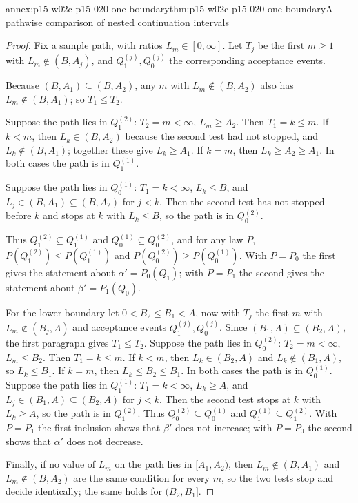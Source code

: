 \begin{annexitem}{annex:p15-w02c-p15-020-one-boundary}{thm:p15-w02c-p15-020-one-boundary}{A pathwise comparison of nested continuation intervals}
\begin{proof}
Fix a sample path, with ratios \(L_m\in[0,\infty]\). Let \(T_j\) be the
first \(m\geq1\) with \(L_m\notin(B,A_j)\), and \(Q_1^{(j)},Q_0^{(j)}\)
the corresponding acceptance events.

Because \((B,A_1)\subseteq(B,A_2)\), any \(m\) with
\(L_m\notin(B,A_2)\) also has \(L_m\notin(B,A_1)\); so \(T_1\leq T_2\).

Suppose the path lies in \(Q_1^{(2)}\): \(T_2=m<\infty\),
\(L_m\geq A_2\). Then \(T_1=k\leq m\). If \(k<m\), then
\(L_k\in(B,A_2)\) because the second test had not stopped, and
\(L_k\notin(B,A_1)\); together these give \(L_k\geq A_1\). If \(k=m\),
then \(L_k\geq A_2\geq A_1\). In both cases the path is in
\(Q_1^{(1)}\).

Suppose the path lies in \(Q_0^{(1)}\): \(T_1=k<\infty\), \(L_k\leq B\),
and \(L_j\in(B,A_1)\subseteq(B,A_2)\) for \(j<k\). Then the second test
has not stopped before \(k\) and stops at \(k\) with \(L_k\leq B\), so
the path is in \(Q_0^{(2)}\).

Thus \(Q_1^{(2)}\subseteq Q_1^{(1)}\) and
\(Q_0^{(1)}\subseteq Q_0^{(2)}\), and for any law \(P\),
\(P(Q_1^{(2)})\leq P(Q_1^{(1)})\) and
\(P(Q_0^{(2)})\geq P(Q_0^{(1)})\). With \(P=P_0\) the first gives the
statement about \(\alpha'=P_0(Q_1)\); with \(P=P_1\) the second gives
the statement about \(\beta'=P_1(Q_0)\).

For the lower boundary let \(0<B_2\leq B_1<A\), now with \(T_j\) the
first \(m\) with \(L_m\notin(B_j,A)\) and acceptance events
\(Q_1^{(j)},Q_0^{(j)}\). Since \((B_1,A)\subseteq(B_2,A)\), the first
paragraph gives \(T_1\leq T_2\).
Suppose the path lies in \(Q_0^{(2)}\): \(T_2=m<\infty\),
\(L_m\leq B_2\). Then \(T_1=k\leq m\). If \(k<m\), then
\(L_k\in(B_2,A)\) and \(L_k\notin(B_1,A)\), so \(L_k\leq B_1\). If
\(k=m\), then \(L_k\leq B_2\leq B_1\). In both cases the path is in
\(Q_0^{(1)}\).
Suppose the path lies in \(Q_1^{(1)}\): \(T_1=k<\infty\), \(L_k\geq A\),
and \(L_j\in(B_1,A)\subseteq(B_2,A)\) for \(j<k\). Then the second test
stops at \(k\) with \(L_k\geq A\), so the path is in \(Q_1^{(2)}\).
Thus \(Q_0^{(2)}\subseteq Q_0^{(1)}\) and
\(Q_1^{(1)}\subseteq Q_1^{(2)}\). With \(P=P_1\) the first inclusion
shows that \(\beta'\) does not increase; with \(P=P_0\) the second shows
that \(\alpha'\) does not decrease.

Finally, if no value of \(L_m\) on the path lies in \([A_1,A_2)\), then
\(L_m\notin(B,A_1)\) and \(L_m\notin(B,A_2)\) are the same condition for
every \(m\), so the two tests stop and decide identically; the same
holds for \((B_2,B_1]\).
\end{proof}
\end{annexitem}

